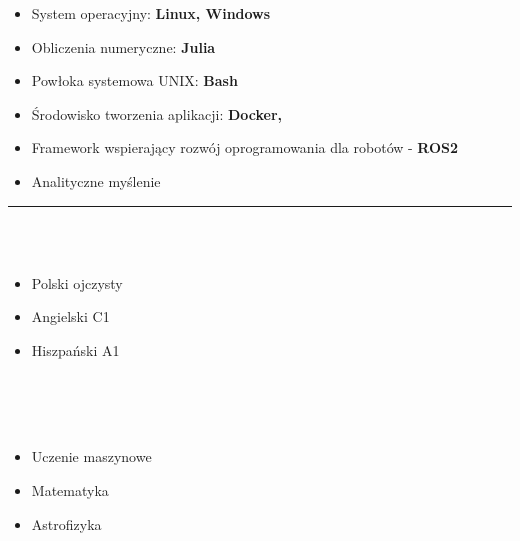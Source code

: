 \documentclass[10pt]{article}
\begin{document}
\begin{paracol}{2}
\begin{leftcolumn}
\begin{itemize}[leftmargin=*]
        \item System operacyjny: \textbf{Linux, Windows}
        \item Obliczenia numeryczne: \textbf{Julia}
        \item Powłoka systemowa UNIX: \textbf{Bash} 
        \item Środowisko tworzenia aplikacji: \textbf{Docker,} 
        \item Framework wspierający rozwój oprogramowania dla robotów - \textbf{ROS2}
        \item Analityczne myślenie
    \end{itemize}

    \rule{6cm}{1pt} \\ \\
    \fontsize{10pt}{10pt}
    \begin{itemize}[leftmargin=*]
        \setlength{\parskip}{0pt}
        \item Polski ojczysty
        \item Angielski C1
        \item Hiszpański A1
    \end{itemize}
    \vspace{1500pt}
    \rule{0pt}{0pt} \\ \\ \\
    \fontsize{10pt}{10pt}
    \begin{itemize}[leftmargin=*]
        \setlength{\parskip}{0pt}
        \item Uczenie maszynowe
        \item Matematyka
        \item Astrofizyka
    \end{itemize}
\end{leftcolumn}


\end{paracol}
\end{document}
